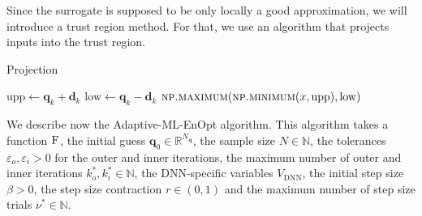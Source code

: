  Since the surrogate is supposed to be only locally a good approximation, we will introduce a trust region method. For that, we use an algorithm that projects inputs into the trust region.
 
 \begin{algorithm}[H]%
\caption{\label{projectionAlg}Projection}
\begin{algorithmic}[1]
\State $\mathrm{upp}\gets\mathbf{q}_k+\mathbf{d}_k$
\State $\mathrm{low}\gets\mathbf{q}_k-\mathbf{d}_k$
\State \Return $\Call{np.maximum}{\protect\Call{np.minimum}{x,\mathrm{upp}},\mathrm{low}}$
\EndFunction
\end{algorithmic}
\end{algorithm}

We describe now the Adaptive-ML-EnOpt algorithm. This algorithm takes a function $\textproc{F}$, the initial guess $\mathbf{q}_0\in\mathbb{R}^{N_\mathbf{q}}$, the sample size $N\in\mathbb{N}$, the tolerances $\varepsilon_o,\varepsilon_i>0$ for the outer and inner iterations, the maximum number of outer and inner iterations $k_o^*,k_i^*\in\mathbb{N}$, the DNN-specific variables $V_{\mathrm{DNN}}$, the initial step size $\beta>0$, the step size contraction $r\in(0,1)$ and the maximum number of step size trials $\nu^*\in\mathbb{N}$.
